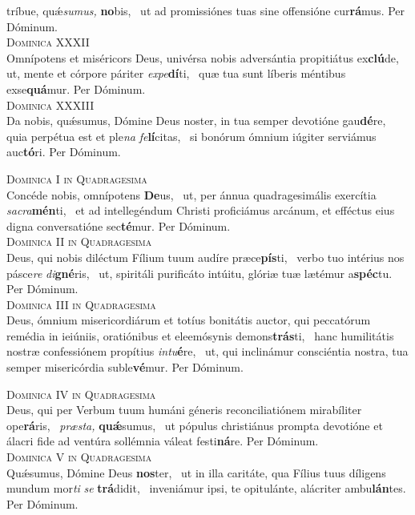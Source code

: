 \begin{translatioMulticol}{2}
tríbue, quǽ\textit{su}\textit{mus,} \textbf{no}bis,~\grestar{}
ut ad promissiónes tuas sine offensióne cur\textbf{rá}mus. Per Dóminum.\\
{\color{red}\textsc{Dominica XXXII}}\\
Omnípotens et miséricors Deus, univérsa nobis adversántia propitiátus ex\textbf{clú}de,~\gredagger{}
ut, mente et córpore páriter \textit{ex}\textit{pe}\textbf{dí}ti,~\grestar{}
quæ tua sunt líberis méntibus exse\textbf{quá}mur. Per Dóminum.\\
{\color{red}\textsc{Dominica XXXIII}}\\
Da nobis, quǽsumus, Dómine Deus noster, in tua semper devotióne gau\textbf{dé}re,~\gredagger{}
quia perpétua est et ple\textit{na} \textit{fe}\textbf{lí}citas,~\grestar{}
si bonórum ómnium iúgiter serviámus auc\textbf{tó}ri. Per Dóminum.
\end{translatioMulticol}

\begin{translatioMulticol}{2}
{\color{red}\textsc{Dominica I in Quadragesima}}\\
Concéde nobis, omnípotens \textbf{De}us,~\gredagger{}
ut, per ánnua quadragesimális exercítia \textit{sa}\textit{cra}\textbf{mén}ti,~\grestar{}
et ad intellegéndum Christi proficiámus arcánum, et efféctus eius digna conversatióne sec\textbf{té}mur. Per Dóminum.\\
{\color{red}\textsc{Dominica II in Quadragesima}}\\
Deus, qui nobis diléctum Fílium tuum audíre præce\textbf{pís}ti,~\gredagger{}
verbo tuo intérius nos pásce\textit{re} \textit{di}\textbf{gné}ris,~\grestar{}
ut, spiritáli purificáto intúitu, glóriæ tuæ lætémur a\textbf{spéc}tu. Per Dóminum.\\
{\color{red}\textsc{Dominica III in Quadragesima}}\\
Deus, ómnium misericordiárum et totíus bonitátis auctor, qui peccatórum remédia in ieiúniis, oratiónibus et eleemósynis demons\textbf{trás}ti,~\gredagger{}
hanc humilitátis nostræ confessiónem propítius \textit{in}\textit{tu}\textbf{é}re,~\grestar{}
ut, qui inclinámur consciéntia nostra, tua semper misericórdia suble\textbf{vé}mur. Per Dóminum.\columnbreak

{\color{red}\textsc{Dominica IV in Quadragesima}}\\
Deus, qui per Verbum tuum humáni géneris reconciliatiónem mirabíliter ope\textbf{rá}ris,~\gredagger{}
\textit{præ}\textit{sta,} \textbf{quǽ}sumus,~\grestar{}
ut pópulus christiánus prompta devotióne et álacri fide ad ventúra sollémnia váleat festi\textbf{ná}re. Per Dóminum.\\
{\color{red}\textsc{Dominica V in Quadragesima}}\\
Quǽsumus, Dómine Deus \textbf{nos}ter,~\gredagger{}
ut in illa caritáte, qua Fílius tuus díligens mundum mor\textit{ti} \textit{se} \textbf{trá}didit,~\grestar{}
inveniámur ipsi, te opitulánte, alácriter ambu\textbf{lán}tes. Per Dóminum.
\end{translatioMulticol}
